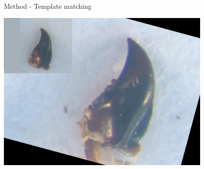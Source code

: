 \documentclass{beamer}
\begin{document}
\begin{frame}{Method - Template matching}
	\begin{center}
		\includegraphics[height=8cm]{images/est19.JPG}	
	\end{center}
\end{frame}
\end{document}
